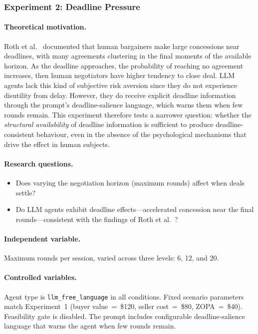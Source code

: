 \subsubsection{Experiment 2: Deadline Pressure}
\label{sec:exp-deadline}

\paragraph{Theoretical motivation.}
Roth et al.~\cite{roth1988deadline} documented that human bargainers make  large concessions near deadlines, with many agreements clustering in the final moments of the available horizon.  As the deadline approaches, the probability of reaching no agreement increases, then human negotiators have higher tendency to close deal. LLM agents lack this kind of subjective risk aversion since they do not experience disutility from delay. However, they do receive explicit deadline information through the prompt's deadline-salience language, which warns them when few rounds remain.  This experiment therefore tests a narrower question: whether the \emph{structural availability} of deadline information is sufficient to produce deadline-consistent behaviour, even in the absence of the psychological mechanisms that drive the effect in human subjects.  

\paragraph{Research questions.}
\begin{itemize}
    \item[\textbf{RQ-21.}] Does varying the negotiation horizon (maximum rounds) affect when deals settle?
    \item[\textbf{RQ-22.}] Do LLM agents exhibit deadline effects---accelerated concession near the final rounds---consistent with the findings of Roth et al.~\cite{roth1988deadline}?
\end{itemize}

\paragraph{Independent variable.}
Maximum rounds per session, varied across three levels: 6, 12, and 20.

\paragraph{Controlled variables.}
Agent type is \texttt{llm\_free\_language} in all conditions.  Fixed scenario parameters match Experiment~1 (buyer value~=~\$120, seller cost~=~\$80, ZOPA~=~\$40).  Feasibility gate is disabled.  The prompt includes configurable deadline-salience language that warns the agent when few rounds remain.

